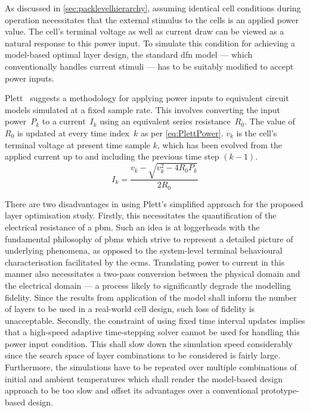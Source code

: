 As   discussed  in   \cref{sec:packlevelhierarchy},   assuming  identical   cell
conditions during operation necessitates that the external stimulus to the cells
is an applied power  value. The cell's terminal voltage as  well as current draw
can  be viewed  as a  natural response  to this  power input.  To simulate  this
condition  for  achieving  a  model-based optimal  layer  design,  the  standard
\gls{dfn} model ---  which conventionally handles current stimuli ---  has to be
suitably modified to accept power inputs.

Plett~\cite{Plett2016}  suggests  a methodology  for  applying  power inputs  to
equivalent  circuit models  simulated  at  a fixed  sample  rate. This  involves
converting the input  power~$P_k$ to a current~$I_k$ using  an equivalent series
resistance~$R_0$. The value  of $R_0$ is updated at every  time index~$k$ as per
\cref{eq:PlettPower}.  $v_k$ is  the  cell's terminal  voltage  at present  time
sample $k$, which has been evolved from  the applied current up to and including
the previous time step $(k-1)$.
\begin{equation}\label{eq:PlettPower}
    I_k = \frac{v_k - \sqrt{v^\text{2}_k - 4R_0P_{k}}}{2R_0}
\end{equation}

There  are  two disadvantages  in  using  Plett's  simplified approach  for  the
proposed layer optimisation study. Firstly, this necessitates the quantification
of the electrical resistance of a \gls{pbm}. Such an idea is at loggerheads with
the fundamental philosophy  of \glspl{pbm} which strive to  represent a detailed
picture  of  underlying  phenomena,  as opposed  to  the  system-level  terminal
behavioural characterisation  facilitated by the \glspl{ecm}.  Translating power
to current  in this manner also  necessitates a two-pass conversion  between the
physical domain and the electrical domain  --- a process likely to significantly
degrade the modelling fidelity. Since the  results from application of the model
shall inform the number  of layers to be used in a  real-world cell design, such
loss of fidelity  is unacceptable. Secondly, the constraint of  using fixed time
interval updates implies that a  high-speed adaptive time-stepping solver cannot
be  used for  handling this  power  input condition.  This shall  slow down  the
simulation speed considerably since the search space of layer combinations to be
considered is  fairly large.  Furthermore, the simulations  have to  be repeated
over  multiple combinations  of  initial and  ambient  temperatures which  shall
render the model-based design approach to  be too slow and offset its advantages
over a conventional prototype-based design.

